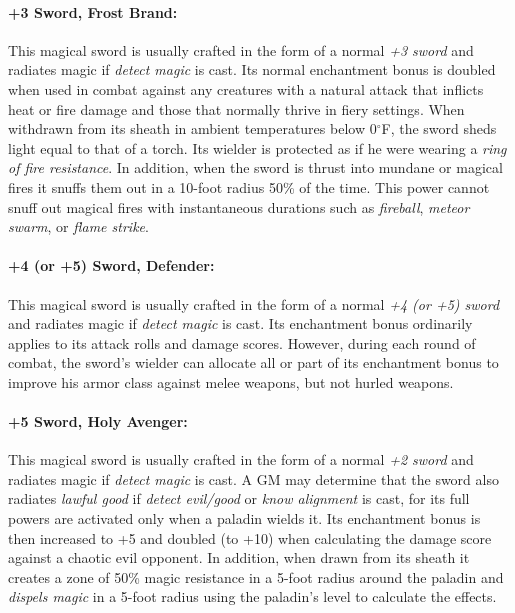 \begin{multicols}{2}
\paragraph{+3 Sword, Frost Brand:} This magical sword is usually crafted in the form of a normal \textit{+3 sword} and radiates magic if \textit{detect magic} is cast.  Its normal enchantment bonus is doubled when used in combat against any creatures with a natural attack that inflicts heat or fire damage and those that normally thrive in fiery settings.  When withdrawn from its sheath in ambient temperatures below 0$^\circ$F, the sword sheds light equal to that of a torch.  Its wielder is protected as if he were wearing a \textit{ring of fire resistance}.  In addition, when the sword is thrust into mundane or magical fires it snuffs them out in a 10-foot radius 50\% of the time.  This power cannot snuff out magical fires with instantaneous durations such as \textit{fireball}, \textit{meteor swarm}, or \textit{flame strike}.

\paragraph{+4 (or +5) Sword, Defender:} This magical sword is usually crafted in the form of a normal \textit{+4 (or +5) sword} and radiates magic if \textit{detect magic} is cast.  Its enchantment bonus ordinarily applies to its attack rolls and damage scores.  However, during each round of combat, the sword's wielder can allocate all or part of its enchantment bonus to improve his armor class against melee weapons, but not hurled weapons.  

\paragraph{+5 Sword, Holy Avenger:} This magical sword is usually crafted in the form of a normal \textit{+2 sword} and radiates magic if \textit{detect magic} is cast.  A GM may determine that the sword also radiates \textit{lawful good} if \textit{detect evil/good} or \textit{know alignment} is cast, for its full powers are activated only when a paladin wields it.  Its enchantment bonus is then increased to +5 and doubled (to +10) when calculating the damage score against a chaotic evil opponent.  In addition, when drawn from its sheath it creates a zone of 50\% magic resistance in a 5-foot radius around the paladin and \textit{dispels magic} in a 5-foot radius using the paladin's level to calculate the effects.


\end{multicols}
